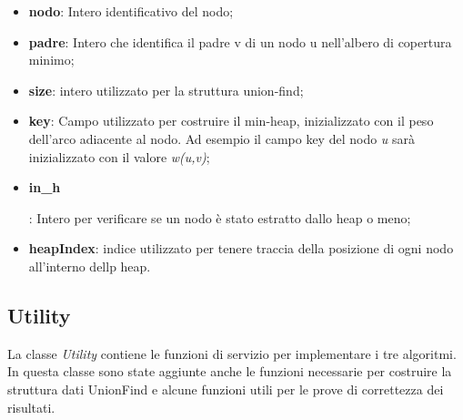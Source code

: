 \begin{itemize}
    \item \textbf{nodo}: Intero identificativo del nodo;
    \item \textbf{padre}: Intero che identifica il padre v di un nodo u nell'albero di copertura minimo;
    \item \textbf{size}: intero utilizzato per la struttura union-find;
    \item \textbf{key}: Campo utilizzato per costruire il min-heap, inizializzato con il peso dell'arco adiacente al nodo. Ad esempio il campo key del nodo \emph{u} sarà inizializzato con il valore \emph{w(u,v)};
    \item \hypertarget{inh}{\textbf{in\_h}}: Intero per verificare se un nodo è stato estratto dallo heap o meno;
    \item \textbf{heapIndex}: indice utilizzato per tenere traccia della posizione di ogni nodo all'interno dellp heap.
\end{itemize}


\subsection{Utility}
\label{Utility}

La classe \textit{Utility} contiene le funzioni di servizio per implementare i tre algoritmi. In questa classe sono state aggiunte anche le funzioni necessarie per costruire la struttura dati UnionFind e alcune funzioni utili per le prove di correttezza dei risultati.

